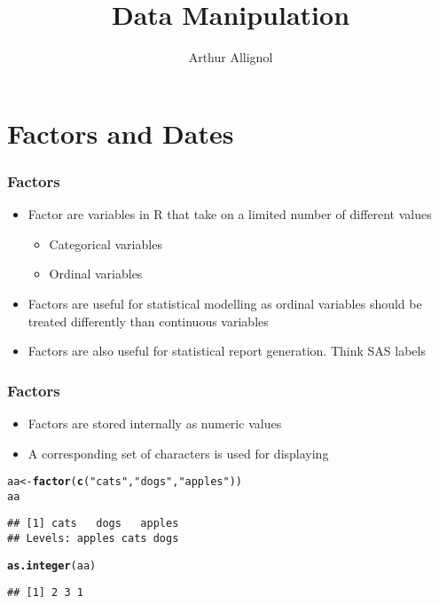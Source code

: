 \documentclass[paper=screen,mathserif]{beamer}\usepackage[]{graphicx}\usepackage[]{color}
\title[Data Manipulation]{Data Manipulation}
\author{Arthur Allignol}
\institute[]{\scriptsize{\url{arthur.allignol@uni-ulm.de}}}
\date{}
\makeatletter
\newcommand{\hlstr}[1]{\textcolor[rgb]{0.192,0.494,0.8}{#1}}%
\newcommand{\hlstd}[1]{\textcolor[rgb]{0.345,0.345,0.345}{#1}}%
\newcommand{\hlkwb}[1]{\textcolor[rgb]{0.69,0.353,0.396}{#1}}%
\newcommand{\hlkwd}[1]{\textcolor[rgb]{0.737,0.353,0.396}{\textbf{#1}}}%
\newenvironment{kframe}{%
 \def\at@end@of@kframe{}%
 \ifinner\ifhmode%
  \def\at@end@of@kframe{\end{minipage}}%
  \begin{minipage}{\columnwidth}%
 \fi\fi%
 \def\FrameCommand##1{\hskip\@totalleftmargin \hskip-\fboxsep
 \colorbox{shadecolor}{##1}\hskip-\fboxsep
     \hskip-\linewidth \hskip-\@totalleftmargin \hskip\columnwidth}%
 \MakeFramed {\advance\hsize-\width
   \@totalleftmargin\z@ \linewidth\hsize
   \@setminipage}}%
 {\par\unskip\endMakeFramed%
 \at@end@of@kframe}
\newenvironment{knitrout}{}{} %
\newcommand{\ft}[1]{\frametitle{#1}}
\makeatother
\begin{document}
\newcommand{\titlep}{yes}  %

{
\renewcommand{\insertframenumber}{}   %
\begin{frame}
\addtocounter{framenumber}{-1}
\titlepage
\end{frame}
}



\section{Factors and Dates}

\begin{frame}[fragile]
  \ft{Factors}
  \begin{itemize}
  \item Factor are variables in R that take on a limited number of
    different values
    \begin{itemize}
    \item Categorical variables
    \item Ordinal variables
    \end{itemize}
  \item Factors are useful for statistical modelling as ordinal
    variables should be treated differently than continuous variables
  \item Factors are also useful for statistical report
    generation. Think SAS labels
  \end{itemize}
\end{frame}

\begin{frame}[fragile]
  \ft{Factors}
  \begin{itemize}
  \item Factors are stored internally as numeric values

  \item A corresponding set of characters is used for displaying
  \end{itemize}
\begin{knitrout}\scriptsize
{}\color{fgcolor}\begin{kframe}
\begin{alltt}
\hlstd{aa} \hlkwb{<-} \hlkwd{factor}\hlstd{(}\hlkwd{c}\hlstd{(}\hlstr{"cats"}\hlstd{,} \hlstr{"dogs"}\hlstd{,} \hlstr{"apples"}\hlstd{))}
\hlstd{aa}
\end{alltt}
\begin{verbatim}
## [1] cats   dogs   apples
## Levels: apples cats dogs
\end{verbatim}
\begin{alltt}
\hlkwd{as.integer}\hlstd{(aa)}
\end{alltt}
\begin{verbatim}
## [1] 2 3 1
\end{verbatim}
\end{kframe}
\end{knitrout}
\end{frame}
\end{document}
